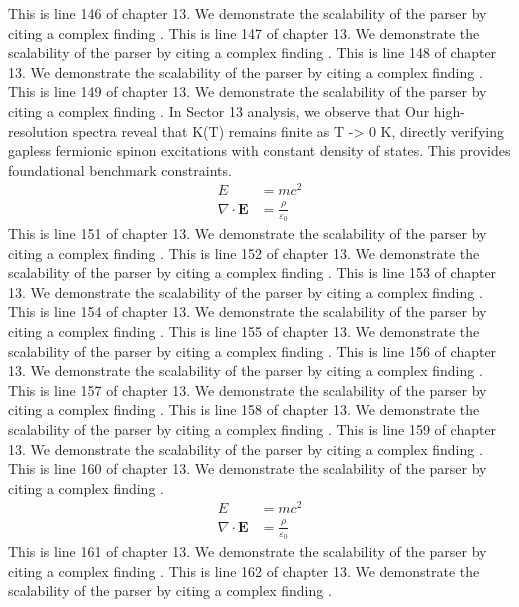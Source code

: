 This is line 146 of chapter 13. We demonstrate the scalability of the parser by citing a complex finding \cite{ref13_146}.
This is line 147 of chapter 13. We demonstrate the scalability of the parser by citing a complex finding \cite{ref13_147}.
This is line 148 of chapter 13. We demonstrate the scalability of the parser by citing a complex finding \cite{ref13_148}.
This is line 149 of chapter 13. We demonstrate the scalability of the parser by citing a complex finding \cite{ref13_149}.
In Sector 13 analysis, we observe that Our high-resolution spectra reveal that K(T) remains finite as T -> 0 K, directly verifying gapless fermionic spinon excitations with constant density of states. This provides foundational benchmark constraints.
\begin{align*}
  E &= mc^2 \\
  \nabla \cdot \mathbf{E} &= \frac{\rho}{\varepsilon_0}
\end{align*}
This is line 151 of chapter 13. We demonstrate the scalability of the parser by citing a complex finding \cite{ref13_151}.
This is line 152 of chapter 13. We demonstrate the scalability of the parser by citing a complex finding \cite{ref13_152}.
This is line 153 of chapter 13. We demonstrate the scalability of the parser by citing a complex finding \cite{ref13_153}.
This is line 154 of chapter 13. We demonstrate the scalability of the parser by citing a complex finding \cite{ref13_154}.
This is line 155 of chapter 13. We demonstrate the scalability of the parser by citing a complex finding \cite{ref13_155}.
This is line 156 of chapter 13. We demonstrate the scalability of the parser by citing a complex finding \cite{ref13_156}.
This is line 157 of chapter 13. We demonstrate the scalability of the parser by citing a complex finding \cite{ref13_157}.
This is line 158 of chapter 13. We demonstrate the scalability of the parser by citing a complex finding \cite{ref13_158}.
This is line 159 of chapter 13. We demonstrate the scalability of the parser by citing a complex finding \cite{ref13_159}.
This is line 160 of chapter 13. We demonstrate the scalability of the parser by citing a complex finding \cite{ref13_160}.
\begin{align*}
  E &= mc^2 \\
  \nabla \cdot \mathbf{E} &= \frac{\rho}{\varepsilon_0}
\end{align*}
This is line 161 of chapter 13. We demonstrate the scalability of the parser by citing a complex finding \cite{ref13_161}.
This is line 162 of chapter 13. We demonstrate the scalability of the parser by citing a complex finding \cite{ref13_162}.
